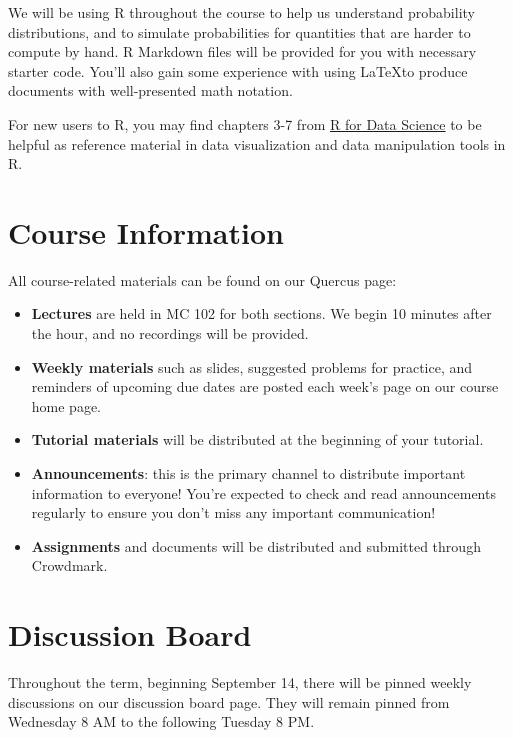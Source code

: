 We will be using R throughout the course to help us understand probability distributions, and to simulate probabilities for quantities that are harder to compute by hand. R Markdown files will be provided for you with necessary starter code.  You'll also gain some experience with using \LaTeX to produce documents with well-presented math notation.

For new users to R, you may find chapters 3-7 from \href{https://r4ds.had.co.nz/}{R for Data Science} to be helpful as reference material in data visualization and data manipulation tools in R.

\section*{Course Information} 

All course-related materials can be found on our Quercus page:

\begin{itemize}
    \item \textbf{Lectures} are held in MC 102 for both sections. We begin 10 minutes after the hour, and no recordings will be provided. 
    \item \textbf{Weekly materials} such as slides, suggested problems for practice, and reminders of upcoming due dates are posted each week's page on our course home page. 
    \item \textbf{Tutorial materials} will be distributed at the beginning of your tutorial. 
    \item \textbf{Announcements}: this is the primary channel to distribute important information to everyone! You're expected to check and read announcements regularly to ensure you don't miss any important communication! 
    \item \textbf{Assignments} and documents will be distributed and submitted through Crowdmark.
\end{itemize}

\section*{Discussion Board} 

Throughout the term, beginning September 14, there will be pinned weekly discussions on our discussion board page. They will remain pinned from Wednesday 8 AM to the following Tuesday 8 PM.

